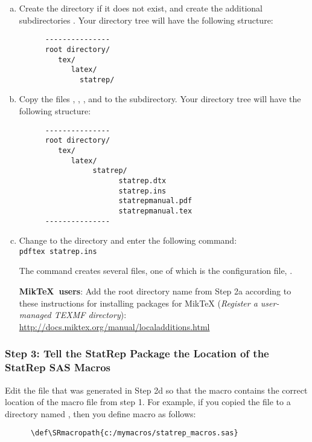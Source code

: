 \documentclass[article,oneside]{memoir}
\begin{document}
\begin{enumerate}[a)]
   \item
   Create the directory if it does not exist, and create the additional
   subdirectories .
   Your directory tree will have the following structure:
\begin{verbatim}
      ---------------
      root directory/
         tex/
            latex/
              statrep/
\end{verbatim}
  \item
   Copy the files , , , 
   and  to
   the  subdirectory. Your directory tree will have the following structure:
\begin{verbatim}
      ---------------
      root directory/  
         tex/
            latex/
                 statrep/
                       statrep.dtx
                       statrep.ins
                       statrepmanual.pdf
                       statrepmanual.tex
      ---------------
\end{verbatim}
   \item
   Change to the  directory and enter the following command:\\
   \texttt{pdftex statrep.ins}

   The command creates several files, one of which is the configuration
   file, .
   
   \textbf{Mik\TeX\ users}:
   Add the root directory name from Step 2a according to these instructions 
   for installing packages for MikTeX 
   (\textit{Register a user-managed TEXMF directory}):
   \url{http://docs.miktex.org/manual/localadditions.html}
   
\end{enumerate}

\subsubsection{Step 3: Tell the StatRep Package the Location of the StatRep SAS Macros}

   Edit the  file that was generated in Step 2d so that the macro 
    contains
   the correct location of the macro file from step 1. For example, if
   you copied the  file to a directory named 
   ,
   then you define macro  as follows:
   \begin{verbatim}
      \def\SRmacropath{c:/mymacros/statrep_macros.sas}
   \end{verbatim}
\end{document}
